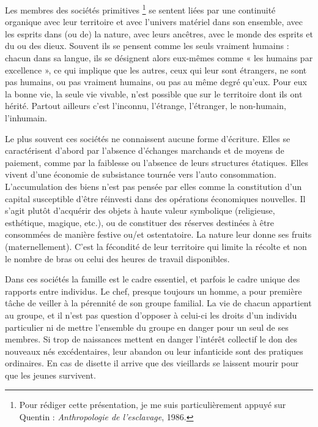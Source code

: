 Les membres des sociétés primitives%
\footnote{Pour rédiger cette présentation, je me suis particulièrement appuyé sur
Quentin  : \emph{Anthropologie de l'esclavage}, 1986.}%
se sentent liées par une 
continuité organique avec leur territoire et avec l'univers matériel dans 
son ensemble, avec les esprits dans (ou de) la nature, avec leurs ancêtres, 
avec le monde des esprits et du ou des dieux. Souvent ils se pensent 
comme les seuls vraiment humains : chacun dans sa langue, ils se 
désignent alors eux-mêmes comme « les humains par excellence », ce
qui implique que les autres, ceux qui leur sont étrangers, ne sont pas humains, 
ou pas vraiment humains, ou pas au même degré qu'eux. Pour eux la 
bonne vie, la seule vie vivable, n'est possible que sur le territoire dont ils 
ont hérité. Partout ailleurs c'est l'inconnu, l'étrange, l'étranger, le
non-humain, l'inhumain.

Le plus souvent ces sociétés ne connaissent aucune forme
d'écriture. Elles se caractérisent d'abord par l'absence d'échanges marchands et 
de moyens de paiement, comme par la faiblesse ou l'absence de leurs 
structures étatiques. Elles vivent d'une économie de subsistance tournée 
vers l'auto consommation. L'accumulation des biens n'est pas pensée par 
elles comme la constitution d'un capital susceptible d'être réinvesti dans 
des opérations économiques nouvelles. Il s'agit plutôt d'acquérir des
objets à haute valeur symbolique (religieuse, esthétique, magique, etc.), ou 
de constituer des réserves destinées à être consommées de manière
festive ou/et ostentatoire. La nature leur donne ses fruits (maternellement). 
C'est la fécondité de leur territoire qui limite la récolte et non le nombre
de bras ou celui des heures de travail disponibles.

Dans ces sociétés la famille est le cadre essentiel, et parfois le
cadre unique des rapports entre individus. Le chef, presque toujours un 
homme, a pour première tâche de veiller à la pérennité de son groupe 
familial. La vie de chacun appartient au groupe, et il n'est pas question 
d'opposer à celui-ci les droits d'un individu particulier ni de mettre
l'ensemble du groupe en danger pour un seul de ses membres. Si trop de 
naissances mettent en danger l'intérêt collectif le don des nouveaux nés 
excédentaires, leur abandon ou leur infanticide sont des pratiques
ordinaires. En cas de disette il arrive que des vieillards se laissent mourir 
pour que les jeunes survivent.

